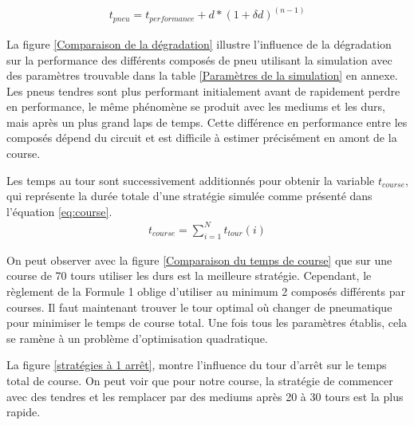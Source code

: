 \begin{equation} \label{eq:pneu}
    \begin{split}
        t_{pneu} = t_{per\textit{f}ormance} + d * (1 + \delta{d}) ^{(n - 1)}
    \end{split}
\end{equation}

La figure \ref{Comparaison de la dégradation} illustre l'influence de la dégradation sur la performance des différents composés de pneu utilisant
la simulation avec des paramètres trouvable dans la table \ref{Paramètres de la simulation} en annexe.
Les pneus tendres sont plus performant initialement avant de rapidement perdre en performance, le même phénomène se produit avec les mediums et les durs, mais après un plus grand laps de temps.
Cette différence en performance entre les composés dépend du circuit et est difficile à estimer précisément en amont de la course.


Les temps au tour sont successivement additionnés pour obtenir la variable $t_{course}$, qui représente la durée totale d'une stratégie simulée comme présenté dans l'équation \ref{eq:course}.
\begin{equation} \label{eq:course}
    \begin{split}
        t_{course} = \sum_{i=1}^{N}{t_{tour}(i)}
    \end{split}
\end{equation}

On peut observer avec la figure \ref{Comparaison du temps de course} que sur une course de 70 tours utiliser les durs est la meilleure stratégie.
Cependant, le règlement de la Formule 1 oblige d'utiliser au minimum 2 composés différents par courses.
Il faut maintenant trouver le tour optimal où changer de pneumatique pour minimiser le temps de course total.
Une fois tous les paramètres établis, cela se ramène à un problème d'optimisation quadratique.

La figure \ref{stratégies à 1 arrêt}, montre l'influence du tour d'arrêt sur le temps total de course.
On peut voir que pour notre course, la stratégie de commencer avec des tendres et les remplacer par des mediums après 20 à 30 tours est la plus rapide.

